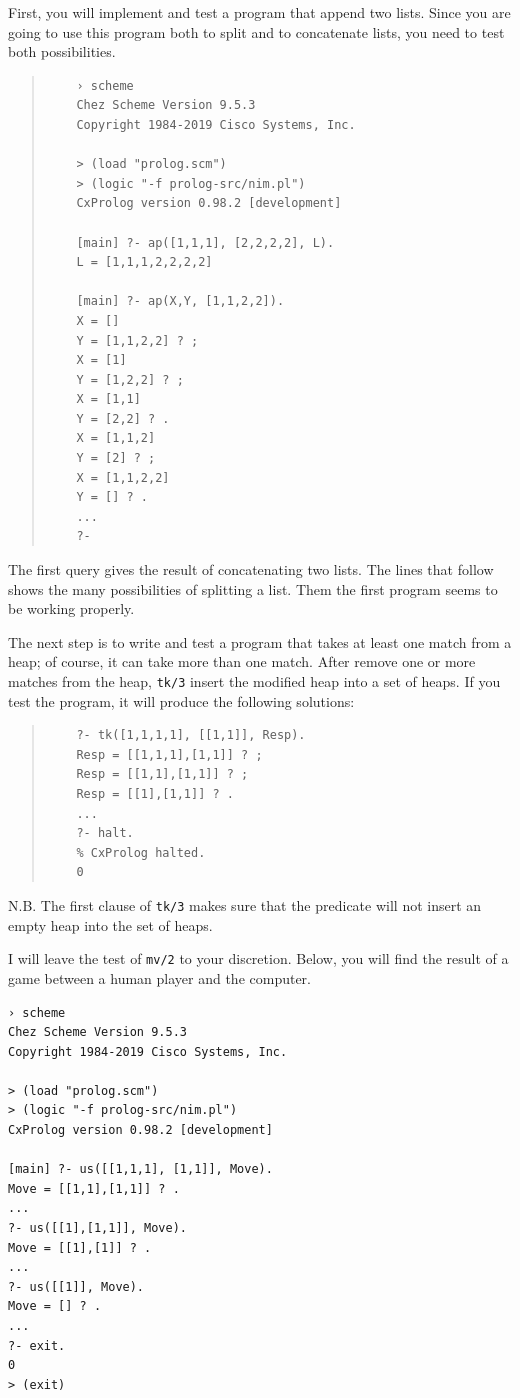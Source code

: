 \documentclass[a4paper,12pt]{book}
\begin{document}
First, you will implement and test a program that append
two lists. Since you are going to use this program both
to split and to concatenate lists, you need to test
both possibilities. 
\begin{quote}
	\begin{verbatim}
	› scheme
	Chez Scheme Version 9.5.3
	Copyright 1984-2019 Cisco Systems, Inc.

	> (load "prolog.scm")
	> (logic "-f prolog-src/nim.pl")
	CxProlog version 0.98.2 [development]

	[main] ?- ap([1,1,1], [2,2,2,2], L).
	L = [1,1,1,2,2,2,2]

	[main] ?- ap(X,Y, [1,1,2,2]).
	X = []
	Y = [1,1,2,2] ? ;
	X = [1]
	Y = [1,2,2] ? ;
	X = [1,1]
	Y = [2,2] ? .
	X = [1,1,2]
	Y = [2] ? ;
	X = [1,1,2,2]
	Y = [] ? .
	...
	?-
	\end{verbatim}
\end{quote}
The first query gives the result of concatenating two
lists. The lines that follow shows the many possibilities
of splitting a list. Them the first program seems to be
working properly. 

The next step is to write and test a program that takes
at least one match from a heap; of course, it can take
more than one match. After remove one or more matches
from the heap, \verb|tk/3| insert the modified heap into
a set of heaps. If you test the program, it will produce
the following solutions:
\begin{quote}
	\begin{verbatim}
	?- tk([1,1,1,1], [[1,1]], Resp).
	Resp = [[1,1,1],[1,1]] ? ;
	Resp = [[1,1],[1,1]] ? ;
	Resp = [[1],[1,1]] ? .
	...
	?- halt.
	% CxProlog halted.
	0
	\end{verbatim}
\end{quote}
N.B. The first clause of \verb|tk/3| makes sure that the
predicate will not insert an empty heap into the set of heaps.

I will leave the test of \verb|mv/2| to your discretion.
Below, you will find the result of a game between a human
player and the computer.

\begin{verbatim}
› scheme
Chez Scheme Version 9.5.3
Copyright 1984-2019 Cisco Systems, Inc.

> (load "prolog.scm")
> (logic "-f prolog-src/nim.pl")
CxProlog version 0.98.2 [development]

[main] ?- us([[1,1,1], [1,1]], Move).
Move = [[1,1],[1,1]] ? .
...
?- us([[1],[1,1]], Move).
Move = [[1],[1]] ? .
...
?- us([[1]], Move).
Move = [] ? .
...
?- exit.
0
> (exit)
\end{verbatim}
\end{document}
